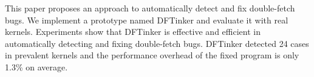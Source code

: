 \documentclass[10pt]{llncs}
\begin{document}
This paper proposes an approach to automatically detect and fix double-fetch bugs. We implement a prototype named DFTinker and evaluate it with real kernels. Experiments show that DFTinker is effective and efficient in automatically detecting and fixing double-fetch bugs. DFTinker detected 24 cases in prevalent kernels and the performance overhead of the fixed program is only 1.3\% on average.








\end{document}
